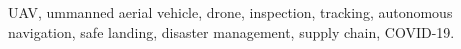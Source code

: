 \documentclass[conference]{IEEEtran}
\begin{document}
\begin{IEEEkeywords}
UAV, ummanned aerial vehicle, drone, inspection, tracking, autonomous navigation, safe landing, disaster management, supply chain, COVID-19.
\end{IEEEkeywords}



%










\end{document}
